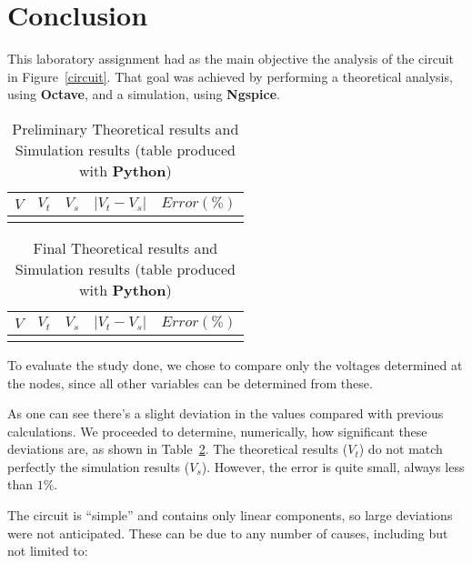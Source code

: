 \section{Conclusion}
\label{sec:conclusion}

This laboratory assignment had as the main objective the analysis of the circuit in Figure~\ref{circuit}. That goal was achieved by performing a theoretical analysis, using {\bf Octave}, and a simulation, using {\bf Ngspice}.

\begin{table}[H]
  \centering
  \begin{tabular}{|c|c|c|c|c|}
    \hline
        $V$ & $V_t$ & $V_s$ & $|V_t-V_s|$ & $Error (\%)$\footnotemark \\
        \hline \\
        \hline 
        
        \hline
  \end{tabular}
  \caption{Preliminary Theoretical results and Simulation results (table produced with {\bf Python})}
  \label{error_res}
\end{table}

\begin{table}[H]
  \centering
  \begin{tabular}{|c|c|c|c|c|}
    \hline
        $V$ & $V_t$ & $V_s$ & $|V_t-V_s|$ & $Error (\%)$\footnotemark \\
        \hline \\
        \hline
        
        \hline
  \end{tabular}
  \caption{Final Theoretical results and Simulation results (table produced with {\bf Python})}
  \label{error_res}
\end{table}


\newpage

To evaluate the study done, we chose to compare only the voltages determined at the nodes, since all other variables can be determined from these.

As one can see there's a slight deviation in the values compared with previous calculations. We proceeded to determine, numerically, how significant these deviations are, as shown in Table~\ref{error_res}. The theoretical results ($V_t$) do not match perfectly the simulation results ($V_s$). However, the error is quite small, always less than $1\%$.

The circuit is ``simple'' and contains only linear components, so large deviations were not anticipated. These can be due to any number of causes, including but not limited to:

